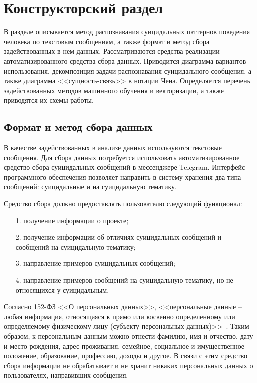 \section{Конструкторский раздел}

В разделе описывается метод распознавания суицидальных паттернов поведения человека по текстовым сообщениям, а также формат и метод сбора задействованных в нем данных.
Рассматриваются средства реализации автоматизированного средства сбора данных.
Приводится диаграмма вариантов использования, декомпозиция задачи распознавания суицидального сообщения, а также диаграмма <<сущность-связь>> в нотации Чена.
Определяется перечень задействованных методов машинного обучения и векторизации, а также приводятся их схемы работы.

\subsection{Формат и метод сбора данных}

В качестве задействованных в анализе данных используются текстовые сообщения. 
Для сбора данных потребуется использовать автоматизированное средство сбора суицидальных сообщений в мессенджере Telegram. 
Интерфейс программного обеспечения позволяет направить в систему хранения два типа сообщений: суицидальные и на суицидальную тематику.

Средство сбора должно предоставлять пользователю следующий функционал:

\begin{enumerate}
\item[1.] получение информации о проекте;
\item[2.] получение информации об отличиях суицидальных сообщений и сообщений на суицидальную тематику;
\item[3.] направление примеров суицидальных сообщений;
\item[4.] направление примеров сообщений на суицидальную тематику, но не относящихся у суицидальным.
\end{enumerate}

Согласно 152-ФЗ <<О персональных данных>>, <<персональные данные -- любая информация, относящаяся к прямо или косвенно определенному или определяемому физическому лицу (субъекту персональных данных)>>~\cite{fzpers}. 
Таким образом, к персональным данным можно отнести фамилию, имя и отчество, дату и место рождения, адрес проживания, семейное, социальное и имущественное положение, образование, профессию, доходы и другое. 
В связи с этим средство сбора информации не обрабатывает и не хранит никаких персональных данных о пользователях, направивших сообщения.

